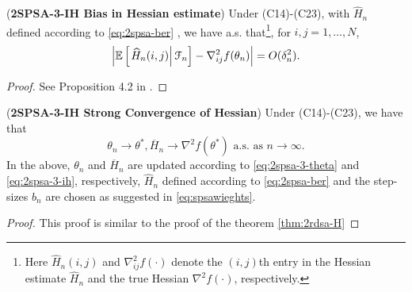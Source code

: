 \begin{lemma}(\textbf{2SPSA-3-IH Bias in Hessian estimate})
\label{lemma:2spsa-bias}
Under (C14)-(C23), with $\widehat H_n$ defined according to  \eqref{eq:2spsa-ber} , we have a.s. that\footnote{Here $\widehat H_n(i,j)$ and $\nabla^2_{ij}f(\cdot)$ denote the $(i,j)$th entry in the Hessian estimate $\widehat H_n$ and the true Hessian $\nabla^2 f(\cdot)$, respectively.}, for $i,j = 1,\ldots,N$,
\begin{align}
\left|\mathbb{E}\left[
\left. \widehat H_n(i,j) \right| \mathcal{F}_n \right] - \nabla^2_{ij} f(\theta_n)\right| = O(\delta_n^2).
\end{align} 
\end{lemma}
\begin{proof}
See Proposition 4.2 in \cite{bhatnagar2015simultaneous}.
\end{proof}


\begin{theorem}(\textbf{2SPSA-3-IH Strong Convergence of Hessian})
\label{thm:2spsa-H}
Under (C14)-(C23), we have that 
$$\theta_n \rightarrow \theta^*, \overline H_n \rightarrow \nabla^2 f(\theta^*) \text{ a.s. as } n\rightarrow \infty.$$ 
In the above, $\theta_n$ and $\overline H_n$ are updated according to \eqref{eq:2spsa-3-theta} and \eqref{eq:2spsa-3-ih}, respectively, $\widehat H_n$ defined according to \eqref{eq:2spsa-ber} and the step-sizes $b_n$ are chosen as suggested in \eqref{eq:spsawieghts}. 
\end{theorem}
\begin{proof}
This proof is similar to the proof of the theorem \ref{thm:2rdsa-H}
\end{proof}

